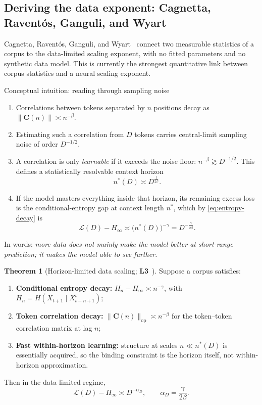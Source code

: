\documentclass[11pt,a4paper]{article}
\theoremstyle{definition}
\newtheorem{theorem}{Theorem}[section]
\begin{document}
\subsection{Deriving the data exponent: Cagnetta, Ravent\'os, Ganguli, and Wyart}
\label{subsec:cagnetta_derivation}

Cagnetta, Ravent\'os, Ganguli, and Wyart~\cite{cagnetta2026deriving} connect two measurable statistics of a corpus to the data-limited scaling exponent, with no fitted parameters and no synthetic data model. This is currently the strongest quantitative link between corpus statistics and a neural scaling exponent.

\begin{intuition}{Conceptual intuition: reading through sampling noise}
\begin{enumerate}[leftmargin=1.5em,nosep]
  \item Correlations between tokens separated by $n$ positions decay as $\|\mathbf{C}(n)\|\asymp n^{-\beta}$.
  \item Estimating such a correlation from $D$ tokens carries central-limit sampling noise of order $D^{-1/2}$.
  \item A correlation is only \emph{learnable} if it exceeds the noise floor: $n^{-\beta}\gtrsim D^{-1/2}$. This defines a statistically resolvable context horizon
  \[ n^*(D) \asymp D^{\frac{1}{2\beta}}. \]
  \item If the model masters everything inside that horizon, its remaining excess loss is the conditional-entropy gap at context length $n^*$, which by \eqref{eq:entropy-decay} is
  \[ \mathcal{L}(D) - H_\infty \asymp \big(n^*(D)\big)^{-\gamma} = D^{-\frac{\gamma}{2\beta}}. \]
\end{enumerate}
In words: \emph{more data does not mainly make the model better at short-range prediction; it makes the model able to see further.}
\end{intuition}

\begin{theorem}[Horizon-limited data scaling; \textbf{L3}~\cite{cagnetta2026deriving}]
Suppose a corpus satisfies:
\begin{enumerate}[leftmargin=1.5em,nosep]
  \item \textbf{Conditional entropy decay:} $H_n - H_\infty \asymp n^{-\gamma}$, with $H_n = H(X_{t+1}\mid X_{t-n+1}^t)$;
  \item \textbf{Token correlation decay:} $\|\mathbf{C}(n)\|_{\mathrm{op}} \asymp n^{-\beta}$ for the token--token correlation matrix at lag $n$;
  \item \textbf{Fast within-horizon learning:} structure at scales $n \ll n^*(D)$ is essentially acquired, so the binding constraint is the horizon itself, not within-horizon approximation.
\end{enumerate}
Then in the data-limited regime,
\begin{equation}
  \boxed{\mathcal{L}(D)-H_\infty \asymp D^{-\alpha_D}, \qquad \alpha_D = \frac{\gamma}{2\beta}} .
  \label{eq:cagnetta}
\end{equation}
\end{theorem}
\end{document}

